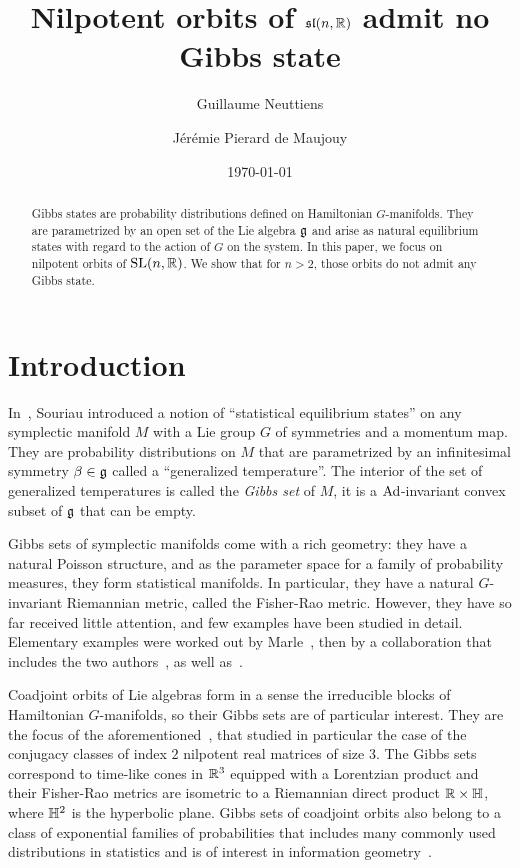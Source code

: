 \documentclass[english]{article}
\title{Nilpotent orbits of $\mathfrak{sl}(n,\mathbb{R})$ admit no Gibbs state}
\date{\today}
\author{Guillaume Neuttiens}
\affil{Friedrich-Schiller Universität Jena, Germany}
\author{Jérémie Pierard de Maujouy}
\affil{Institut Denis Poisson - Université de Tours, France}
\begin{document}
\maketitle

\begin{abstract}
     Gibbs states are probability distributions defined on Hamiltonian $G$-manifolds. They are parametrized by an open set of the Lie algebra $\mathfrak g$ and arise as natural equilibrium states with regard to the action of $G$ on the system. In this paper, we focus on nilpotent orbits of $\operatorname{SL}(n, \mathbb{R)}$. We show that for $n>2$, those orbits do not admit any Gibbs state.
\end{abstract}

\section{Introduction}

In~\cite{SSDEng}, Souriau introduced a notion of \enquote{statistical equilibrium states} on any symplectic manifold $M$ with a Lie group $G$ of symmetries and a momentum map.
They are probability distributions on $M$ that are parametrized by an infinitesimal symmetry $\beta \in \mathfrak g$ called a \enquote{generalized temperature}.
The interior of the set of generalized temperatures is called the \emph{Gibbs set} of $M$, it is a $\operatorname{Ad}$-invariant convex subset of $\mathfrak g$ that can be empty.

Gibbs sets of symplectic manifolds come with a rich geometry: they have a natural Poisson structure, and as the parameter space for a family of probability measures, they form statistical manifolds.
In particular, they have a natural $G$-invariant Riemannian metric, called the Fisher-Rao metric.
However, they have so far received little attention, and few examples have been studied in detail.
Elementary examples were worked out by Marle~\cite{MarleExamples}, then by a collaboration that includes the two authors~\cite{NilpotentOrbitsGSI23}, as well as~\cite{HessianGas}.

Coadjoint orbits of Lie algebras form in a sense the irreducible blocks of Hamiltonian $G$-manifolds, so their Gibbs sets are of particular interest.
They are the focus of the aforementioned~\cite{NilpotentOrbitsGSI23}, that studied in particular the case of the conjugacy classes of index $2$ nilpotent real matrices of size $3$.
The Gibbs sets correspond to time-like cones in $\mathbb{R}^3$ equipped with a Lorentzian product and their Fisher-Rao metrics are isometric to a Riemannian direct product $\mathbb{R} \times \mathbb{H}$, where $\mathbb{H}^2$ is the hyperbolic plane. 
Gibbs sets of coadjoint orbits also belong to a class of exponential families of probabilities that includes many commonly used distributions in statistics and is of interest in information geometry~\cite{TojoYoshino}.
\end{document}
